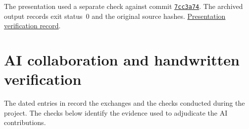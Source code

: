 \documentclass[11pt]{article}
\theoremstyle{definition}
\begin{document}
The presentation used a separate check against commit
\href{https://github.com/wbgradost/ai-project/blob/7cc3a7406e09ba1544ff6997d5d742430c6c771c/paper/paper.pdf}
{\texttt{7cc3a74}}.
The archived output records exit status~0 and the original source hashes.
\href{https://github.com/wbgradost/ai-project/blob/4e08d41135cb1f4b563efcc349c1f2a14f8e0d58/lean/Grados26Learning/verification.txt}
{Presentation verification record}.

\clearpage
\section{AI collaboration and handwritten verification}\label{app:ai}
The dated entries in  record the exchanges and the checks
conducted during the project. The checks below identify the evidence used
to adjudicate the AI contributions.
\end{document}
